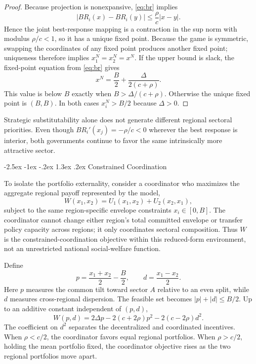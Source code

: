 \documentclass[12pt]{article}
\makeatletter
\renewcommand\section{\@startsection{section}{1}{\z@}%
  {-2.5ex \@plus -1ex \@minus -.2ex}%
  {1.3ex \@plus .2ex}%
  {\centering\normalfont\fontsize{14}{16}\selectfont\bfseries}}
\makeatother
\begin{document}
\begin{proof}
Because projection is nonexpansive, \eqref{eq:br} implies
\[
|BR_i(x)-BR_i(y)|\le \frac{\rho}{c}|x-y|.
\]
Hence the joint best-response mapping is a contraction in the sup norm with modulus $\rho/c<1$, so it has a unique fixed point. Because the game is symmetric, swapping the coordinates of any fixed point produces another fixed point; uniqueness therefore implies $x_1^N=x_2^N=x^N$. If the upper bound is slack, the fixed-point equation from \eqref{eq:br} gives
\[
x^N=\frac{B}{2}+\frac{\Delta}{2(c+\rho)}.
\]
This value is below $B$ exactly when $B>\Delta/(c+\rho)$. Otherwise the unique fixed point is $(B,B)$. In both cases $x_i^N>B/2$ because $\Delta>0$.
\end{proof}

Strategic substitutability alone does not generate different regional sectoral priorities. Even though $BR_i'(x_j)=-\rho/c<0$ wherever the best response is interior, both governments continue to favor the same intrinsically more attractive sector.

\section{Constrained Coordination}

To isolate the portfolio externality, consider a coordinator who maximizes the aggregate regional payoff represented by the model,
\[
W(x_1,x_2)=U_1(x_1,x_2)+U_2(x_2,x_1),
\]
subject to the same region-specific envelope constraints $x_i\in[0,B]$. The coordinator cannot change either region's total committed envelope or transfer policy capacity across regions; it only coordinates sectoral composition. Thus $W$ is the constrained-coordination objective within this reduced-form environment, not an unrestricted national social-welfare function.

Define
\begin{equation}
p=\frac{x_1+x_2}{2}-\frac{B}{2},
\qquad
d=\frac{x_1-x_2}{2}.
\label{eq:pd}
\end{equation}
Here $p$ measures the common tilt toward sector $A$ relative to an even split, while $d$ measures cross-regional dispersion. The feasible set becomes $|p|+|d|\le B/2$. Up to an additive constant independent of $(p,d)$,
\begin{equation}
W(p,d)=2\Delta p-2(c+2\rho)p^2-2(c-2\rho)d^2.
\label{eq:welfare}
\end{equation}
The coefficient on $d^2$ separates the decentralized and coordinated incentives. When $\rho<c/2$, the coordinator favors equal regional portfolios. When $\rho>c/2$, holding the mean portfolio fixed, the coordinator objective rises as the two regional portfolios move apart.
\end{document}
